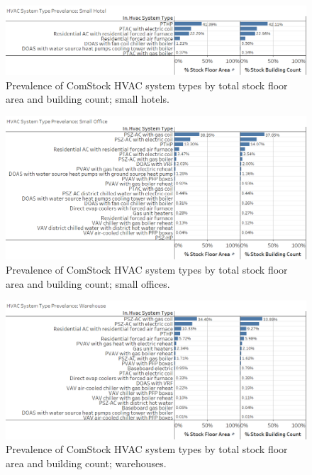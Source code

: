 \begin{figure}
    \centering \includegraphics[width=1.0\textwidth]{figures/HVAC_SYS_Type_PREV_Small_Hotel.png}
    \caption[HVAC system type prevalence in small hotels]{Prevalence of ComStock HVAC system types by total stock floor area and building count; small hotels.}
    \label{fig:hvac_sys_type_prevalence_small_hotel}
\end{figure}

\begin{figure}
    \centering \includegraphics[width=1.0\textwidth]{figures/HVAC_SYS_Type_PREV_Small_Office.png}
    \caption[HVAC system type prevalence in small offices]{Prevalence of ComStock HVAC system types by total stock floor area and building count; small offices.}
    \label{fig:hvac_sys_type_prevalence_small_office}
\end{figure}

\begin{figure}
    \centering \includegraphics[width=1.0\textwidth]{figures/HVAC_SYS_Type_PREV_Warehouse.png}
    \caption[HVAC system type prevalence in warehouses]{Prevalence of ComStock HVAC system types by total stock floor area and building count; warehouses.}
    \label{fig:hvac_sys_type_prevalence_warehouse}
\end{figure}

